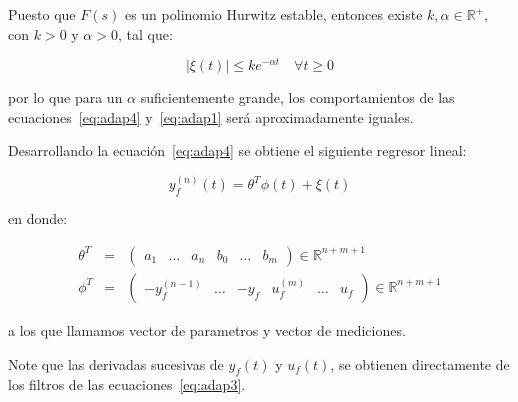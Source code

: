         Puesto que $F(s)$ es un polinomio Hurwitz estable, entonces existe $k, \alpha \in \mathbb{R}^+$, con $k > 0$ y $\alpha > 0$, tal que:

        \begin{equation*}
            |\xi(t)| \le k e^{- \alpha t} \quad \forall t \ge 0
        \end{equation*}

        por lo que para un $\alpha$ suficientemente grande, los comportamientos de las ecuaciones~\ref{eq:adap4} y~\ref{eq:adap1} será aproximadamente iguales.

        Desarrollando la ecuación~\ref{eq:adap4} se obtiene el siguiente regresor lineal:

        \begin{equation}
            y_f^{(n)}(t) = \theta^T \phi(t) + \xi(t)
        \end{equation}

        en donde:

        \begin{eqnarray} \label{eq:adap5}
            \theta^T & = & \begin{pmatrix} a_1 & \dots & a_n & b_0 & \dots & b_m \end{pmatrix} \in \mathbb{R}^{n+m+1} \nonumber \\
            \phi^T & = & \begin{pmatrix} -y_f^{(n-1)} & \dots & -y_f & u_f^{(m)} & \dots & u_f \end{pmatrix} \in \mathbb{R}^{n+m+1}
        \end{eqnarray}

        a los que llamamos vector de parametros y vector de mediciones.

        Note que las derivadas sucesivas de $y_f(t)$ y $u_f(t)$, se obtienen directamente de los filtros de las ecuaciones~\ref{eq:adap3}.

